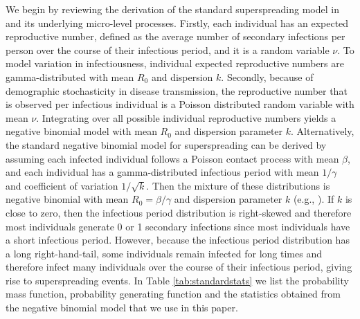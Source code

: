 \documentclass{imammb}
\numberwithin{equation}{section}
\begin{document}
We begin by reviewing the derivation of the standard superspreading model in \citet{Lloyd-Smith2005-ma} and its underlying micro-level processes. 
Firstly, each individual has an expected reproductive number, defined as the average number of secondary infections per person over the course of their infectious period, and it is a random variable $\nu$. To model variation in infectiousness, individual expected reproductive numbers are gamma-distributed with mean $R_0$ and dispersion $k$. Secondly, because of demographic stochasticity in disease transmission, the reproductive number that is observed per infectious individual is a Poisson distributed random variable with mean $\nu$. Integrating over all possible individual reproductive numbers yields a negative binomial model with mean $R_0$ and dispersion parameter $k$. Alternatively, the standard negative binomial model for superspreading can be derived by assuming each infected individual follows a Poisson contact process with mean $\beta$, and each individual has a gamma-distributed infectious period with mean $1/\gamma$ and coefficient of variation $1/\sqrt{k}$. Then the mixture of these distributions is negative binomial with mean $R_0 = \beta/\gamma$ and dispersion parameter $k$ (e.g., \citep{Mode2000-hp,Diekmann2013-zu, Yan2008-jc}). If $k$ is close to zero, then the infectious period distribution is right-skewed and therefore most individuals generate 0 or 1 secondary infections since most individuals have a short infectious period. However, because the infectious period distribution has a long right-hand-tail, some individuals remain infected for long times and therefore infect many individuals over the course of their infectious period, giving rise to superspreading events. In Table \ref{tab:standardstats} we list the probability mass function, probability generating function and the statistics obtained from the negative binomial model that we use in this paper. 
\end{document}
